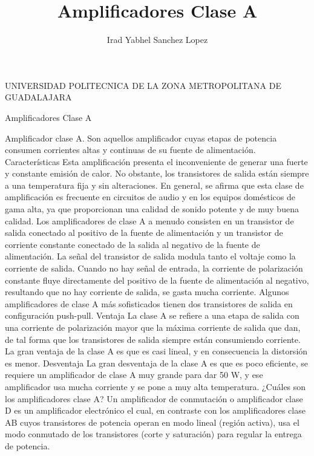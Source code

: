 \documentclass[10pt,a4paper]{article}
\author{Irad Yabhel Sanchez Lopez}
\title{Amplificadores Clase A }
\begin{document}
UNIVERSIDAD POLITECNICA DE LA ZONA METROPOLITANA DE GUADALAJARA


Amplificadores Clase A

Amplificador clase A. Son aquellos amplificador cuyas etapas de potencia consumen corrientes altas y continuas de su fuente de alimentación.
Características
Esta amplificación presenta el inconveniente de generar una fuerte y constante emisión de calor. No obstante, los transistores de salida están siempre a una temperatura fija y sin alteraciones.
En general, se afirma que esta clase de amplificación es frecuente en circuitos de audio y en los equipos domésticos de gama alta, ya que proporcionan una calidad de sonido potente y de muy buena calidad.
Los amplificadores de clase A a menudo consisten en un transistor de salida conectado al positivo de la fuente de alimentación y un transistor de corriente constante conectado de la salida al negativo de la fuente de alimentación.
La señal del transistor de salida modula tanto el voltaje como la corriente de salida. Cuando no hay señal de entrada, la corriente de polarización constante fluye directamente del positivo de la fuente de alimentación al negativo, resultando que no hay corriente de salida, se gasta mucha corriente. Algunos amplificadores de clase A más sofisticados tienen dos transistores de salida en configuración push-pull.
Ventaja
La clase A se refiere a una etapa de salida con una corriente de polarización mayor que la máxima corriente de salida que dan, de tal forma que los transistores de salida siempre están consumiendo corriente. La gran ventaja de la clase A es que es casi lineal, y en consecuencia la distorsión es menor.
Desventaja
La gran desventaja de la clase A es que es poco eficiente, se requiere un amplificador de clase A muy grande para dar 50 W, y ese amplificador usa mucha corriente y se pone a muy alta temperatura.
¿Cuáles son los amplificadores clase A?
Un amplificador de conmutación o amplificador clase D es un amplificador electrónico el cual, en contraste con los amplificadores clase AB cuyos transistores de potencia operan en modo lineal (región activa), usa el modo conmutado de los transistores (corte y saturación) para regular la entrega de potencia.
\end{document}
